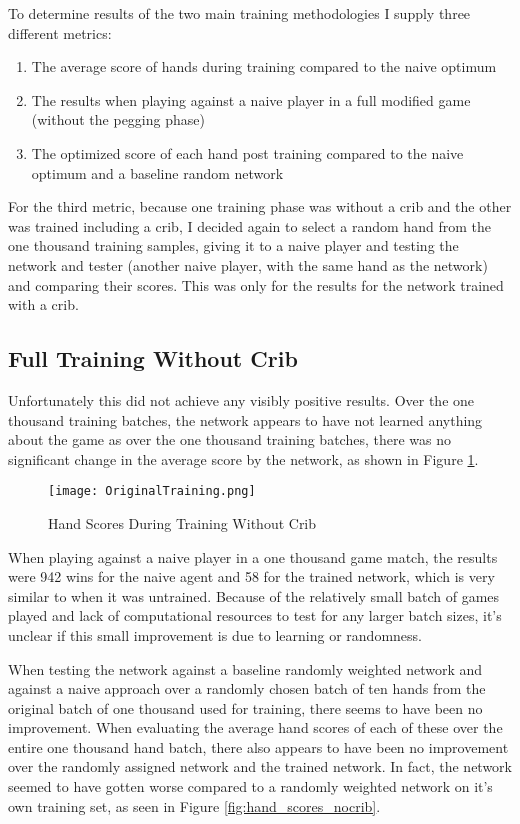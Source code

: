 \documentclass[]{article}
\begin{document}
To determine results of the two main training methodologies I supply three different metrics: 
\begin{enumerate}
    \item The average score of hands during training compared to the naive optimum 
    \item The results when playing against a naive player in a full modified game (without the pegging phase)
    \item The optimized score of each hand post training compared to the naive optimum and a baseline random network
\end{enumerate}

For the third metric, because one training phase was without a crib and the other was trained including a crib, I decided again to select a random hand from the one thousand training samples, giving it to a naive player and testing the network and tester (another naive player, with the same hand as the network) and comparing their scores. This was only for the results for the network trained with a crib. 

\subsection{Full Training Without Crib}

Unfortunately this did not achieve any visibly positive results. Over the one thousand training batches, the network appears to have not learned anything about the game as over the one thousand training batches, there was no significant change in the average score by the network, as shown in Figure \ref{fig:training_nocrib}.

\begin{figure}[h]
    \caption{Hand Scores During Training Without Crib}\label{fig:training_nocrib}
    \texttt{[image: OriginalTraining.png]}
\end{figure}


When playing against a naive player in a one thousand game match, the results were 942 wins for the naive agent and 58 for the trained network, which is very similar to when it was untrained. Because of the relatively small batch of games played and lack of computational resources to test for any larger batch sizes, it's unclear if this small improvement is due to learning or randomness. 

When testing the network against a baseline randomly weighted network and against a naive approach over a randomly chosen batch of ten hands from the original batch of one thousand used for training, there seems to have been no improvement. When evaluating the average hand scores of each of these over the entire one thousand hand batch, there also appears to have been no improvement over the randomly assigned network and the trained network. In fact, the network seemed to have gotten worse compared to a randomly weighted network on it's own training set, as seen in Figure \ref{fig:hand_scores_nocrib}.
\end{document}
